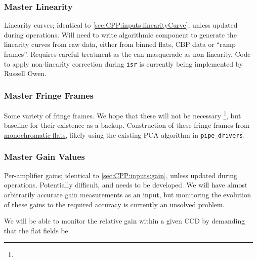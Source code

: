 \subsubsection{Master Linearity}\label{sec:CPP:output:linearityCurve}
Linearity curves; identical to \secsymbol\ref{sec:CPP:inputs:linearityCurve}, unless updated during operations.
\alg Will need to write algorithmic component to generate the linearity curves from raw data, either from binned flats, CBP data or ``ramp frames''. Requires careful treatment as the \bfeffect can masquerade as non-linearity. Code to apply non-linearity correction during \texttt{isr} is currently being implemented by Russell Owen.


\subsubsection{Master Fringe Frames}\label{sec:CPP:output:fringeFrames}
Some variety of fringe frames. We hope that these will not be necessary \footnote{}, but baseline for their existence as a backup.
\alg Construction of these fringe frames from \hyperref[sec:CPP:output:monoFlat]{monochromatic flats}, likely using the existing PCA algorithm in \texttt{pipe\_drivers}.


\subsubsection{Master Gain Values}\label{sec:CPP:output:gains}
Per-amplifier gains; identical to \secsymbol\ref{sec:CPP:inputs:gain}, unless updated during operations.
\alg Potentially difficult, and needs to be developed. We will have almost arbitrarily accurate gain measurements as an input, but monitoring the evolution of these gains to the required accuracy is currently an unsolved problem.

We will be able to monitor the relative gain within a given CCD by demanding that the flat fields be


